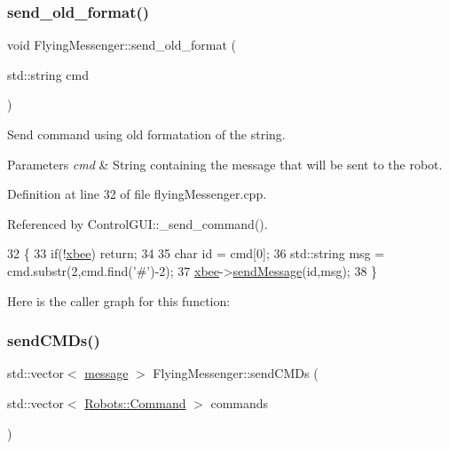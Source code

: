 \subsubsection{\texorpdfstring{send\+\_\+old\+\_\+format()}{send\_old\_format()}}
{\footnotesize\ttfamily void Flying\+Messenger\+::send\+\_\+old\+\_\+format (\begin{DoxyParamCaption}\item[{std\+::string}]{cmd }\end{DoxyParamCaption})}



Send command using old formatation of the string. 


\begin{DoxyParams}{Parameters}
{\em cmd} & String containing the message that will be sent to the robot. \\
\hline
\end{DoxyParams}


Definition at line 32 of file flying\+Messenger.\+cpp.



Referenced by Control\+G\+U\+I\+::\+\_\+send\+\_\+command().


\begin{DoxyCode}
32                                                    \{
33     \textcolor{keywordflow}{if}(!\hyperlink{class_flying_messenger_a419820a45ea2bc496c10bf36b7b49033}{xbee}) \textcolor{keywordflow}{return};
34 
35     \textcolor{keywordtype}{char} \textcolor{keywordtype}{id} = cmd[0];
36     std::string msg = cmd.substr(2,cmd.find(\textcolor{charliteral}{'#'})-2);
37     \hyperlink{class_flying_messenger_a419820a45ea2bc496c10bf36b7b49033}{xbee}->\hyperlink{class_serial_com_a0a371f0bf00f14bcf6ef23c752276144}{sendMessage}(\textcolor{keywordtype}{id},msg);
38 \}
\end{DoxyCode}
Here is the caller graph for this function\+:
\mbox{\label{class_flying_messenger_a97b0db02039cde3d9d80225e4db0f23a}} 
\subsubsection{\texorpdfstring{send\+C\+M\+Ds()}{sendCMDs()}}
{\footnotesize\ttfamily std\+::vector$<$ \hyperlink{structmessage}{message} $>$ Flying\+Messenger\+::send\+C\+M\+Ds (\begin{DoxyParamCaption}\item[{std\+::vector$<$ \hyperlink{struct_robots_1_1_command}{Robots\+::\+Command} $>$}]{commands }\end{DoxyParamCaption})}



